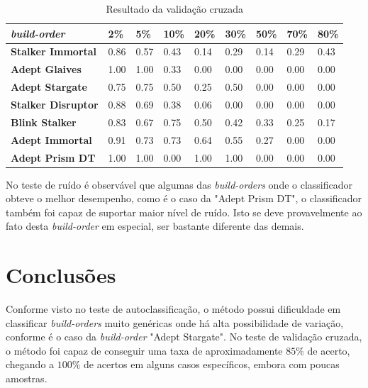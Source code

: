 \begin{table}[H]
\centering
\caption{Resultado da validação cruzada}
\label{tab:resultados-cruzada}
\begin{tabular}{l|l|l|l|l|l|l|l|l}
	\textit{\Gls{build-order}} 		& 2\%  & 5\%  & 10\% & 20\% & 30\% & 50\% & 70\% & 80\% \\ \hline
	\textbf{Stalker Immortal} 	& 0.86 & 0.57 & 0.43 & 0.14 & 0.29 & 0.14 & 0.29 & 0.43 \\
	\textbf{Adept Glaives} 		& 1.00 & 1.00 & 0.33 & 0.00 & 0.00 & 0.00 & 0.00 & 0.00 \\
	\textbf{Adept Stargate} 		& 0.75 & 0.75 & 0.50 & 0.25 & 0.50 & 0.00 & 0.00 & 0.00 \\
	\textbf{Stalker Disruptor} 	& 0.88 & 0.69 & 0.38 & 0.06 & 0.00 & 0.00 & 0.00 & 0.00 \\
	\textbf{Blink Stalker} 		& 0.83 & 0.67 & 0.75 & 0.50 & 0.42 & 0.33 & 0.25 & 0.17 \\
	\textbf{Adept Immortal} 		& 0.91 & 0.73 & 0.73 & 0.64 & 0.55 & 0.27 & 0.00 & 0.00 \\
	\textbf{Adept Prism DT} 		& 1.00 & 1.00 & 0.00 & 1.00 & 1.00 & 0.00 & 0.00 & 0.00 \\
\end{tabular}
\end{table}

No teste de ruído é observável que algumas das \textit{\glspl{build-order}} onde o classificador obteve o melhor desempenho, como é o caso da "Adept Prism DT", o classificador também foi capaz de suportar maior nível de ruído. Isto se deve provavelmente ao fato desta \textit{\gls{build-order}} em especial, ser bastante diferente das demais.

	\chapter{Conclusões}
Conforme visto no teste de autoclassificação, o método possui dificuldade em classificar \textit{\glspl{build-order}} muito genéricas onde há alta possibilidade de variação, conforme é o caso da \textit{\gls{build-order}} "Adept Stargate". No teste de validação cruzada, o método foi capaz de conseguir uma taxa de aproximadamente $85\%$ de acerto, chegando a $100\%$ de acertos em alguns casos específicos, embora com poucas amostras.

